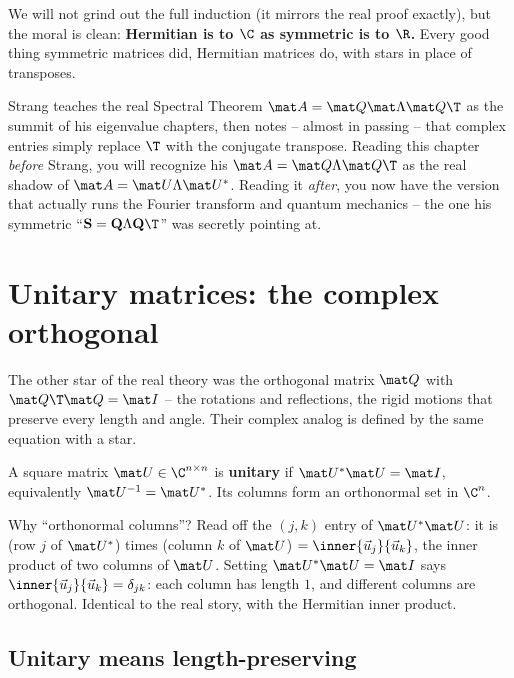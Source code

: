 We will not grind out the full induction (it mirrors the real proof exactly), but
the moral is clean: \textbf{Hermitian is to $\C$ as symmetric is to $\R$.} Every
good thing symmetric matrices did, Hermitian matrices do, with stars in place of
transposes.

\begin{strangbox}
Strang teaches the real Spectral Theorem $\mat A=\mat Q\mat\Lambda\mat Q\T$ as the
summit of his eigenvalue chapters, then notes -- almost in passing -- that complex
entries simply replace $\T$ with the conjugate transpose. Reading this chapter
\emph{before} Strang, you will recognize his $\mat A=\mat Q\Lambda\mat Q\T$ as the
real shadow of $\mat A=\mat U\Lambda\mat U^{*}$. Reading it \emph{after}, you now
have the version that actually runs the Fourier transform and quantum mechanics --
the one his symmetric ``$\mathbf{S}=\mathbf{Q}\Lambda\mathbf{Q}\T$'' was secretly
pointing at.
\end{strangbox}

\section{Unitary matrices: the complex orthogonal}

The other star of the real theory was the orthogonal matrix $\mat Q$ with
$\mat Q\T\mat Q=\mat I$ -- the rotations and reflections, the rigid motions that
preserve every length and angle. Their complex analog is defined by the same
equation with a star.

\begin{definition}\label{ch32:unitarydef}
A square matrix $\mat U\in\C^{n\times n}$ is \textbf{unitary} if
$\mat U^{*}\mat U = \mat I$, equivalently $\mat U^{-1} = \mat U^{*}$. Its columns
form an orthonormal set in $\C^n$.
\end{definition}

Why ``orthonormal columns''? Read off the $(j,k)$ entry of $\mat U^{*}\mat U$: it
is (row $j$ of $\mat U^{*}$) times (column $k$ of $\mat U$) $=
\inner{\vec u_j}{\vec u_k}$, the inner product of two columns of $\mat U$.
Setting $\mat U^{*}\mat U=\mat I$ says $\inner{\vec u_j}{\vec u_k} = \delta_{jk}$:
each column has length $1$, and different columns are orthogonal. Identical to the
real story, with the Hermitian inner product.

\subsection{Unitary means length-preserving}


